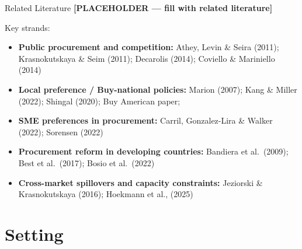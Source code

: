\documentclass[9pt,aspectratio=169]{beamer}
\begin{document}
\begin{frame}{Related Literature}
\textbf{[PLACEHOLDER — fill with related literature]}

\medskip
Key strands:
\begin{itemize}
  \item \textbf{Public procurement and competition:}
        Athey, Levin \& Seira (2011); Krasnokutskaya \& Seim (2011);
        Decarolis (2014); Coviello \& Mariniello (2014)
  \item \textbf{Local preference / Buy-national policies:}
        Marion (2007); Kang \& Miller (2022); Shingal (2020); Buy American paper;
  \item \textbf{SME preferences in procurement:}
        Carril, Gonzalez-Lira \& Walker (2022); Sorensen (2022)
  \item \textbf{Procurement reform in developing countries:}
        Bandiera et al.\ (2009); Best et al.\ (2017); Bosio et al.\ (2022)
  \item \textbf{Cross-market spillovers and capacity constraints:}
        Jeziorski \& Krasnokutskaya (2016); Hoekmann et al., (2025)
\end{itemize}

\end{frame}


\section{Setting}
\end{document}
